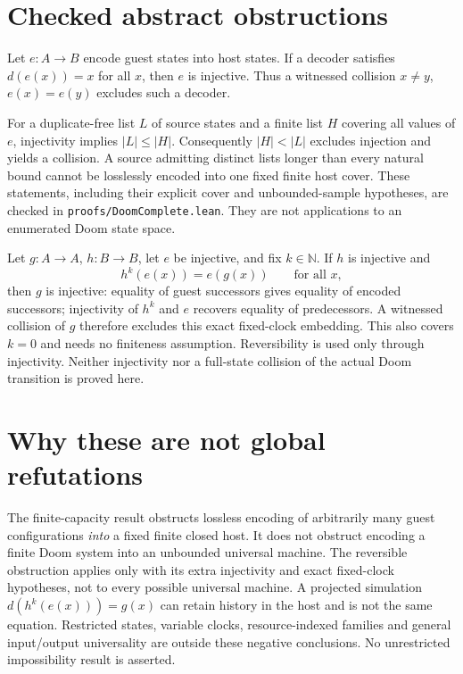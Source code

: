 \documentclass[11pt]{article}
\begin{document}
\section{Checked abstract obstructions}
Let $e:A\to B$ encode guest states into host states. If a decoder satisfies
$d(e(x))=x$ for all $x$, then $e$ is injective. Thus a witnessed collision
$x\ne y$, $e(x)=e(y)$ excludes such a decoder.

For a duplicate-free list $L$ of source states and a finite list $H$ covering
all values of $e$, injectivity implies $|L|\leq |H|$. Consequently
$|H|<|L|$ excludes injection and yields a collision. A source admitting distinct
lists longer than every natural bound cannot be losslessly encoded into one
fixed finite host cover. These statements, including their explicit cover and
unbounded-sample hypotheses, are checked in
\texttt{proofs/DoomComplete.lean}. They are not applications to an enumerated
Doom state space.

Let $g:A\to A$, $h:B\to B$, let $e$ be injective, and fix $k\in\mathbb N$.
If $h$ is injective and
\[
 h^k(e(x))=e(g(x))\qquad\text{for all }x,
\]
then $g$ is injective: equality of guest successors gives equality of encoded
successors; injectivity of $h^k$ and $e$ recovers equality of predecessors.
A witnessed collision of $g$ therefore excludes this exact fixed-clock
embedding. This also covers $k=0$ and needs no finiteness assumption.
Reversibility is used only through injectivity. Neither injectivity nor a
full-state collision of the actual Doom transition is proved here.

\section{Why these are not global refutations}
The finite-capacity result obstructs lossless encoding of arbitrarily many
guest configurations \emph{into} a fixed finite closed host. It does not
obstruct encoding a finite Doom system into an unbounded universal machine.
The reversible obstruction applies only with its extra injectivity and exact
fixed-clock hypotheses, not to every possible universal machine.
A projected simulation $d(h^k(e(x)))=g(x)$ can retain history in the host and
is not the same equation. Restricted states, variable clocks, resource-indexed
families and general input/output universality are outside these negative
conclusions. No unrestricted impossibility result is asserted.
\end{document}
